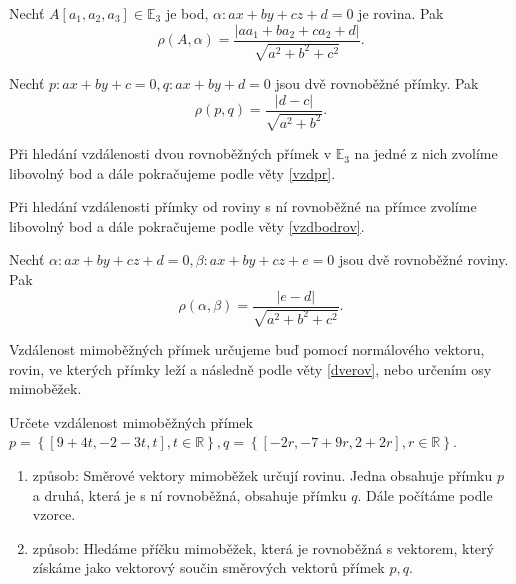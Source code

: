 \begin{veta}\label{vzdbodrov}
    Nechť $A[a_1,a_2,a_3]\in \mathbb E_3$ je bod, $\alpha:ax+by+cz+d=0$ je rovina. Pak
    $$\rho(A,\alpha)=\frac{|aa_1+ba_2+ca_2+d|}{\sqrt{a^2+b^2+c^2} }.$$
\end{veta}

\begin{veta}\label{vzdpr}
    Nechť $p:ax+by+c=0,q:ax+by+d=0$ jsou dvě rovnoběžné přímky. Pak
    $$\rho(p,q)=\frac{|d-c|}{\sqrt{a^2+b^2} }.$$
\end{veta}

\begin{pozn}
    Při hledání vzdálenosti dvou rovnoběžných přímek v $\mathbb E_3$ na jedné z nich zvolíme
    libovolný bod a dále pokračujeme podle věty \ref{vzdpr}.
\end{pozn}

\begin{pozn}
    Při hledání vzdálenosti přímky od roviny s ní rovnoběžné na přímce zvolíme
    libovolný bod a dále pokračujeme podle věty \ref{vzdbodrov}.
\end{pozn}

\begin{veta}\label{dverov}
    Nechť $\alpha:ax+by+cz+d=0,\beta:ax+by+cz+e=0$ jsou dvě rovnoběžné roviny. Pak
    $$\rho(\alpha,\beta)=\frac{|e-d|}{\sqrt{a^2+b^2+c^2} }.$$
\end{veta}

\begin{pozn}
    Vzdálenost mimoběžných přímek určujeme buď pomocí normálového vektoru, rovin,
    ve kterých přímky leží a následně podle věty \ref{dverov}, nebo určením
    osy mimoběžek.
\end{pozn}

\begin{priklad}
Určete vzdálenost mimoběžných přímek $p=\left \{ [9+4t,-2-3t,t],t \in \mathbb R \right \} ,q=\left \{ [-2r,-7+9r,2+2r],r \in \mathbb R \right \} $.
\end{priklad}

\begin{reseni}
\begin{enumerate}[1.]
\item způsob: Směrové vektory mimoběžek určují rovinu. Jedna obsahuje přímku $p$ a druhá,
která je s ní rovnoběžná, obsahuje přímku $q$. Dále počítáme podle vzorce.
\item způsob: Hledáme příčku mimoběžek, která je rovnoběžná s vektorem, který
získáme jako vektorový součin směrových vektorů přímek $p,q$.
\end{enumerate}
\end{reseni}

